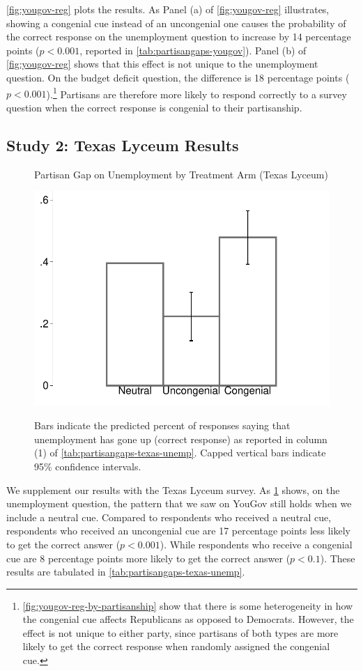 \documentclass[12pt, letterpaper]{article}
\begin{document}
\cref{fig:yougov-reg} plots the results. As Panel (a) of \cref{fig:yougov-reg} illustrates, showing a congenial cue instead of an uncongenial one causes the probability of the correct response on the unemployment question to increase by 14 percentage points ($p < 0.001$, reported in \cref{tab:partisangaps-yougov}). Panel (b) of \cref{fig:yougov-reg} shows that this effect is not unique to the unemployment question. On the budget deficit question, the difference is 18 percentage points ($p<0.001$).\footnote{\cref{fig:yougov-reg-by-partisanship} show that there is some heterogeneity in how the congenial cue affects Republicans as opposed to Democrats. However, the effect is not unique to either party, since partisans of both types are more likely to get the correct response when randomly assigned the congenial cue.} Partisans are therefore more likely to respond correctly to a survey question when the correct response is congenial to their partisanship. 

\subsection*{Study 2: Texas Lyceum Results}\label{subsec:txlyceum_results}

\begin{figure}[!t]
	\centering
	\caption{Partisan Gap on Unemployment by Treatment Arm (Texas Lyceum)}
	\includegraphics[width=.55\textwidth]{../figs/texas-unemp-congenialcue.pdf}
	\label{fig:partisangaps-texas-unemp}
	\caption*{\footnotesize 
		Bars indicate the predicted percent of responses saying that unemployment has gone up (correct response) as reported in column (1) of \cref{tab:partisangaps-texas-unemp}.  
		Capped vertical bars indicate 95\% confidence intervals.
	}
\end{figure}

We supplement our results with the Texas Lyceum survey. As \cref{fig:partisangaps-texas-unemp} shows, on the unemployment question, the pattern that we saw on YouGov still holds when we include a neutral cue. Compared to respondents who received a neutral cue, respondents who received an uncongenial cue are 17 percentage points less likely to get the correct answer ($p<0.001$). While respondents who receive a congenial cue are 8 percentage points more likely to get the correct answer ($p<0.1$). These results are tabulated in \cref{tab:partisangaps-texas-unemp}.
\end{document}
